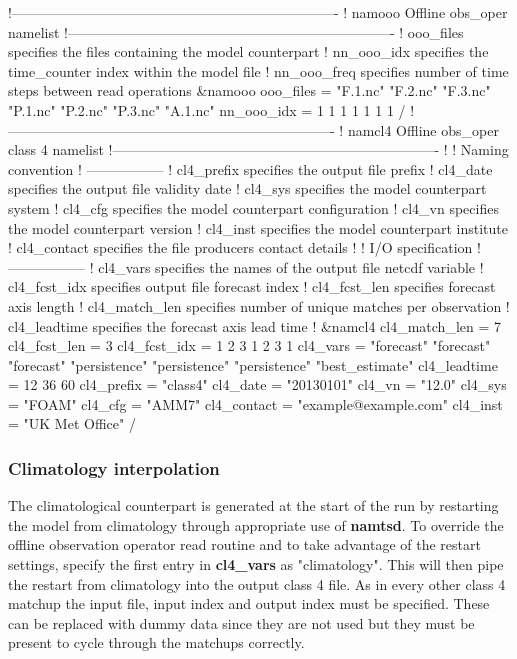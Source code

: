 \documentclass[../tex_main/NEMO_manual]{subfiles}
\begin{document}
\begin{forlines}
!----------------------------------------------------------------------
!       namooo Offline obs_oper namelist
!----------------------------------------------------------------------
!   ooo_files    specifies the files containing the model counterpart
!   nn_ooo_idx   specifies the time_counter index within the model file
!   nn_ooo_freq  specifies number of time steps between read operations
&namooo
   ooo_files = "F.1.nc" "F.2.nc" "F.3.nc" "P.1.nc" "P.2.nc" "P.3.nc" "A.1.nc"
   nn_ooo_idx = 1 1 1 1 1 1 1
/
!----------------------------------------------------------------------
!       namcl4 Offline obs_oper class 4 namelist
!----------------------------------------------------------------------
!
!  Naming convention
!  -----------------
!  cl4_prefix    specifies the output file prefix
!  cl4_date      specifies the output file validity date
!  cl4_sys       specifies the model counterpart system
!  cl4_cfg       specifies the model counterpart configuration
!  cl4_vn        specifies the model counterpart version
!  cl4_inst      specifies the model counterpart institute
!  cl4_contact   specifies the file producers contact details
!
!  I/O specification
!  -----------------
!  cl4_vars      specifies the names of the output file netcdf variable
!  cl4_fcst_idx  specifies output file forecast index
!  cl4_fcst_len  specifies forecast axis length
!  cl4_match_len specifies number of unique matches per observation
!  cl4_leadtime  specifies the forecast axis lead time 
!
&namcl4
   cl4_match_len = 7
   cl4_fcst_len = 3
   cl4_fcst_idx = 1 2 3 1 2 3 1
   cl4_vars = "forecast" "forecast" "forecast" "persistence" "persistence"
              "persistence" "best_estimate"
   cl4_leadtime = 12 36 60
   cl4_prefix = "class4"
   cl4_date = "20130101"
   cl4_vn = "12.0"
   cl4_sys = "FOAM"
   cl4_cfg = "AMM7"
   cl4_contact = "example@example.com"
   cl4_inst = "UK Met Office"
/
\end{forlines}

\subsubsection{Climatology interpolation}

The climatological counterpart is generated at the start of the run by restarting 
the model from climatology through appropriate use of \textbf{namtsd}. To override
the offline observation operator read routine and to take advantage of the restart
settings, specify the first entry in \textbf{cl4\_vars} as "climatology". This will then
pipe the restart from climatology into the output class 4 file. As in every other
class 4 matchup the input file, input index and output index must be specified.
These can be replaced with dummy data since they are not used but they must be
present to cycle through the matchups correctly. 
\end{document}
